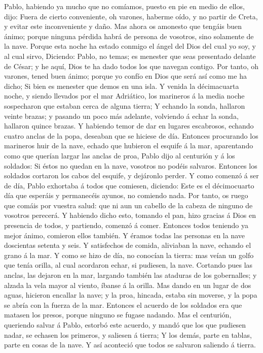 Pablo, habiendo ya mucho que no comíamos, puesto en pie en medio de
ellos, dijo: Fuera de cierto conveniente, oh varones, haberme oído, y no
partir de Creta, y evitar este inconveniente y daño.  Mas
ahora os amonesto que tengáis buen ánimo; porque ninguna pérdida habrá
de persona de vosotros, sino solamente de la nave.  Porque
esta noche ha estado conmigo el ángel del Dios del cual yo soy, y al
cual sirvo,  Diciendo: Pablo, no temas; es menester que
seas presentado delante de César; y he aquí, Dios te ha dado todos los
que navegan contigo.  Por tanto, oh varones, tened buen
ánimo; porque yo confío en Dios que será así como me ha dicho;
 Si bien es menester que demos en una isla.  Y
venida la décimacuarta noche, y siendo llevados por el mar Adriático,
los marineros á la media noche sospecharon que estaban cerca de alguna
tierra;  Y echando la sonda, hallaron veinte brazas; y
pasando un poco más adelante, volviendo á echar la sonda, hallaron
quince brazas.  Y habiendo temor de dar en lugares
escabrosos, echando cuatro anclas de la popa, deseaban que se hiciese de
día.  Entonces procurando los marineros huir de la nave,
echado que hubieron el esquife á la mar, aparentando como que querían
largar las anclas de proa,  Pablo dijo al centurión y á los
soldados: Si éstos no quedan en la nave, vosotros no podéis salvaros.
 Entonces los soldados cortaron los cabos del esquife, y
dejáronlo perder.  Y como comenzó á ser de día, Pablo
exhortaba á todos que comiesen, diciendo: Este es el décimocuarto día
que esperáis y permanecéis ayunos, no comiendo nada.  Por
tanto, os ruego que comáis por vuestra salud: que ni aun un cabello de
la cabeza de ninguno de vosotros perecerá.  Y habiendo
dicho esto, tomando el pan, hizo gracias á Dios en presencia de todos, y
partiendo, comenzó á comer.  Entonces todos teniendo ya
mejor ánimo, comieron ellos también.  Y éramos todas las
personas en la nave doscientas setenta y seis.  Y
satisfechos de comida, aliviaban la nave, echando el grano á la mar.
 Y como se hizo de día, no conocían la tierra: mas veían un
golfo que tenía orilla, al cual acordaron echar, si pudiesen, la nave.
 Cortando pues las anclas, las dejaron en la mar, largando
también las ataduras de los gobernalles; y alzada la vela mayor al
viento, íbanse á la orilla.  Mas dando en un lugar de dos
aguas, hicieron encallar la nave; y la proa, hincada, estaba sin
moverse, y la popa se abría con la fuerza de la mar. 
Entonces el acuerdo de los soldados era que matasen los presos, porque
ninguno se fugase nadando.  Mas el centurión, queriendo
salvar á Pablo, estorbó este acuerdo, y mandó que los que pudiesen
nadar, se echasen los primeros, y saliesen á tierra;  Y los
demás, parte en tablas, parte en cosas de la nave. Y así aconteció que
todos se salvaron saliendo á tierra.

